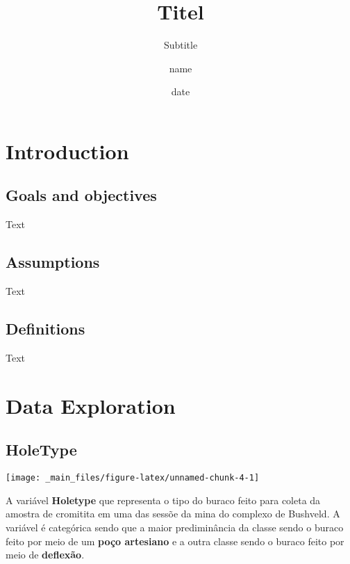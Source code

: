 \documentclass[
]{article}
\title{Titel}
\subtitle{Subtitle}
\author{name}
\date{date}
\begin{document}
\NoBgThispage %

\maketitle



{
\setcounter{tocdepth}{3}
\tableofcontents
}
\hypertarget{introduction}{%
\section{Introduction}\label{introduction}}

\hypertarget{goals-and-objectives}{%
\subsection{Goals and objectives}\label{goals-and-objectives}}

Text

\hypertarget{assumptions}{%
\subsection{Assumptions}\label{assumptions}}

Text

\hypertarget{definitions}{%
\subsection{Definitions}\label{definitions}}

Text

\newpage

\newpage

\hypertarget{data-exploration}{%
\section{Data Exploration}\label{data-exploration}}

\hypertarget{holetype}{%
\subsection{HoleType}\label{holetype}}

\begin{center}\texttt{[image: \_main\_files/figure-latex/unnamed-chunk-4-1]} \end{center}

A variável \textbf{Holetype} que representa o tipo do buraco feito para coleta da amostra de cromitita em uma das sessõe da mina do complexo de Bushveld. A variável é categórica sendo que a maior prediminância da classe sendo o buraco feito por meio de um \textbf{poço artesiano} e a outra classe sendo o buraco feito por meio de \textbf{deflexão}.
\end{document}
